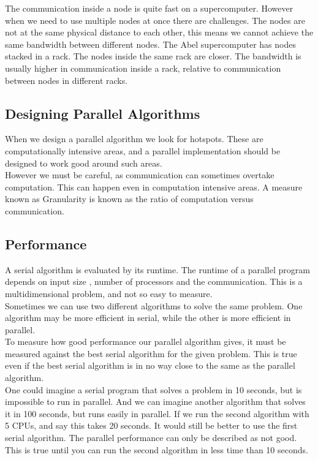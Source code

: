 \documentclass[a4paper,norsk,11pt,twoside]{report}
\begin{document}
The communication inside a node is quite fast on a
supercomputer. However when we need to use multiple nodes at once
there are challenges. The nodes are not at the same physical distance
to each other, this means we cannot achieve the same bandwidth
between different nodes. The Abel supercomputer has nodes stacked in a
rack. The nodes inside the same rack are closer. The bandwidth is
usually higher in communication inside a rack, relative to
communication between nodes in different racks.

\subsection{Designing Parallel Algorithms}
When we design a parallel algorithm we look for hotspots. These are
computationally intensive areas, and a parallel implementation should be
designed to work good around such areas. \\

However we must be careful, as communication can sometimes overtake
computation. This can happen even in computation intensive areas. A
measure known as Granularity is known as the ratio of computation
versus communication.

\subsection{Performance}
A serial algorithm is evaluated by its runtime. The runtime of a
parallel program depends on input size , number of processors and the
communication. This is a multidimensional problem, and not so easy to
measure. \\

Sometimes we can use two different algorithms to solve the same
problem. One algorithm may be more efficient in serial, while the
other is more efficient in parallel. \\

To measure how good performance our parallel algorithm gives, it must
be measured against the best serial algorithm for the given
problem. This is true even if the best serial algorithm is in no way
close to the same as the parallel algorithm. \\

One could imagine a serial program that solves a problem in 10
seconds, but is impossible to run in parallel. And we can imagine
another algorithm that solves it in 100 seconds, but runs easily in
parallel. If we run the second algorithm with 5 CPUs, and say this
takes 20 seconds. It would still be better to use the first serial
algorithm. The parallel performance can only be described as not
good. This is true until you can run the second algorithm in less time
than 10 seconds. \\
\end{document}
